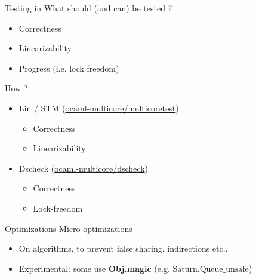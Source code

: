  \begin{frame}{Testing in \Saturn}
    What should (and can) be tested ?
    \begin{itemize}[label=$\bullet$]
     \item Correctness 
     \item Linearizability
     \item Progress (i.e. lock freedom) 
    \end{itemize}
    How ?
    \begin{itemize}[label=$\bullet$]
     \item Lin / STM (\href{https://github.com/ocaml-multicore/multicoretests}{ocaml-multicore/multicoretest})
        \begin{itemize}
            \item Correctness
            \item Linearizability
        \end{itemize}
     \item Dscheck (\href{https://github.com/ocaml-multicore/dscheck}{ocaml-multicore/dscheck})\begin{itemize}
        \item Correctness
        \item Lock-freedom
        \end{itemize}
    \end{itemize}
 
  \end{frame}



\begin{frame}{Optimizations}
    Micro-optimizations
    \begin{itemize}[label=$\diamond$]
        \item On algorithms, to prevent false sharing, indirections etc..
        \item Experimental: some use \textbf{Obj.magic} (e.g. $\text{Saturn.Queue\_unsafe}$)
    \end{itemize}
\end{frame}

